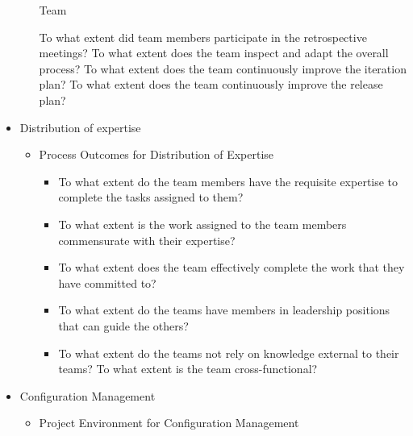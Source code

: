 \begin{itemize}
		\begin{itemize}
			\indicatorAddition Team
				\begin{itemize}
					\addition To what extent did team members participate in the retrospective meetings?
					\addition To what extent does the team inspect and adapt the overall process?
					\addition To what extent does the team continuously improve the iteration plan?
					\addition To what extent does the team continuously improve the release plan?
				\end{itemize}
		\end{itemize}
					
	\item Distribution of expertise 
		\begin{itemize}
			\item Process Outcomes for Distribution of Expertise
				\begin{itemize}
					\item To what extent do the team members have the requisite expertise to complete the tasks assigned to them? 
					\item To what extent is the work assigned to the team members commensurate with their expertise? 
					\item To what extent does the team effectively complete the work that they have committed to? 
					\item To what extent do the teams have members in leadership positions that can guide the others? 
					\item To what extent do the teams not rely on knowledge external to their teams? 
					\addition To what extent is the team cross-functional?
				\end{itemize}
		\end{itemize}
	\item Configuration Management
		\begin{itemize}
			\item Project Environment for Configuration Management

\end{itemize}
\end{itemize}
